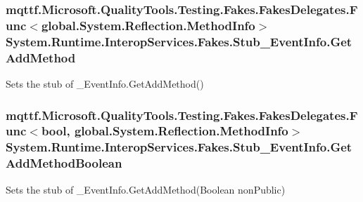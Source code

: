 \hypertarget{class_system_1_1_runtime_1_1_interop_services_1_1_fakes_1_1_stub___event_info_a7749377a7d768677274ed1624628afe6}{
\subsubsection[{Get\-Add\-Method}]{\setlength{\rightskip}{0pt plus 5cm}mqttf.\-Microsoft.\-Quality\-Tools.\-Testing.\-Fakes.\-Fakes\-Delegates.\-Func$<$global.\-System.\-Reflection.\-Method\-Info$>$ System.\-Runtime.\-Interop\-Services.\-Fakes.\-Stub\-\_\-\-Event\-Info.\-Get\-Add\-Method}}\label{class_system_1_1_runtime_1_1_interop_services_1_1_fakes_1_1_stub___event_info_a7749377a7d768677274ed1624628afe6}


Sets the stub of \-\_\-\-Event\-Info.\-Get\-Add\-Method()

\hypertarget{class_system_1_1_runtime_1_1_interop_services_1_1_fakes_1_1_stub___event_info_acff8ba0e740421d0a91298203c0d6999}{
\subsubsection[{Get\-Add\-Method\-Boolean}]{\setlength{\rightskip}{0pt plus 5cm}mqttf.\-Microsoft.\-Quality\-Tools.\-Testing.\-Fakes.\-Fakes\-Delegates.\-Func$<$bool, global.\-System.\-Reflection.\-Method\-Info$>$ System.\-Runtime.\-Interop\-Services.\-Fakes.\-Stub\-\_\-\-Event\-Info.\-Get\-Add\-Method\-Boolean}}\label{class_system_1_1_runtime_1_1_interop_services_1_1_fakes_1_1_stub___event_info_acff8ba0e740421d0a91298203c0d6999}


Sets the stub of \-\_\-\-Event\-Info.\-Get\-Add\-Method(\-Boolean non\-Public)

